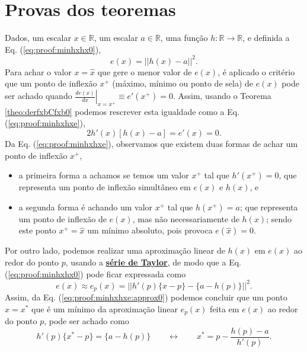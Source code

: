 \section{Provas dos teoremas}
 
\begin{myproofT}\label{proof:theo:minhxhx}
Dados,
um escalar $x \in \mathbb{R}$, 
um escalar $a \in \mathbb{R}$,  
uma função $h:\mathbb{R} \rightarrow \mathbb{R}$, e 
definida a Eq. (\ref{eq:proof:minhxhx0}),
\begin{equation}\label{eq:proof:minhxhx0}
e(x)=||h(x)-a||^2.
\end{equation}
Para achar o valor  $x=\hat{x}$ que gere o menor valor de $e(x)$, é aplicado
o critério que um ponto de inflexão $x^+$ (máximo, mínimo ou ponto de sela) de $e(x)$ 
pode ser achado quando 
$\left. \frac{d e(x)}{d x }\right|_{x=x^+} \equiv e'(x^+) =0$.
Assim, 
usando o Teorema \ref{theo:derfxbCfxb0} podemos 
rescrever esta igualdade como a Eq. (\ref{eq:proof:minhxhxe}),
\begin{equation}\label{eq:proof:minhxhxe}
2  h'(x) \left[h(x) -a\right] = e'(x)=0.
\end{equation}
Da Eq. (\ref{eq:proof:minhxhxe}), observamos 
que existem duas formas de achar um ponto de inflexão $x^+$,
\begin{itemize}
 \item a primeira forma a achamos se temos um valor $x^+$ tal que $h'(x^+)=0$, 
que representa um ponto de inflexão simultâneo em $e(x)$ e $h(x)$, e
 \item a segunda forma é achando um valor $x^+$ tal que $h(x^+)=a$;
que representa um ponto de inflexão de $e(x)$, mas não
necessariamente de $h(x)$; 
sendo este ponto $x^+=\hat{x}$ um mínimo absoluto, pois provoca $e(\hat{x})=0$.
\end{itemize}




Por outro lado, podemos realizar uma aproximação linear de $h(x)$ em $e(x)$
ao redor do ponto $p$, usando a \hyperref[def:taylor]{\textbf{série de Taylor}},
de modo que a Eq. (\ref{eq:proof:minhxhx0}) pode ficar expressada como
\begin{equation}\label{eq:proof:minhxhxe:approx0}
e(x) \approx  e_p(x) = ||h'(p)\{x-p\}-\{a-h(p)\}||^2.
\end{equation}
Assim, da Eq. (\ref{eq:proof:minhxhxe:approx0})
podemos concluir que um ponto $x=x^*$ que é 
um mínimo da aproximação linear $e_p(x)$ feita em $e(x)$ ao redor do ponto $p$,
pode ser achado como
\begin{equation}\label{eq:proof:minhxhx2}
 h'(p)\{x^*-p\} = \{a-h(p)\} \qquad \leftrightarrow \qquad x^* = p - \frac{h(p)-a}{ h'(p)}.
\end{equation} 


\end{myproofT}
